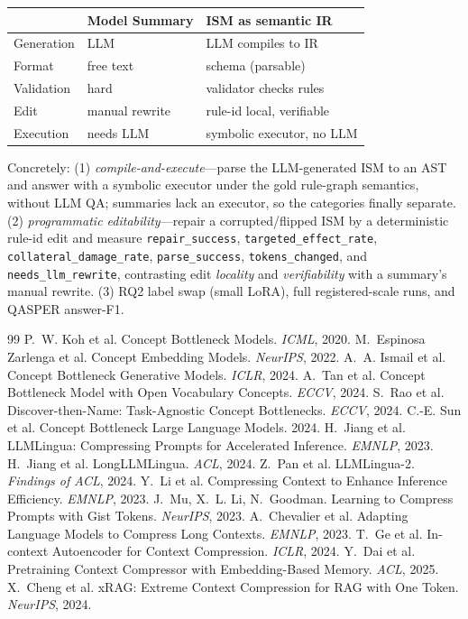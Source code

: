 \documentclass{article}
\begin{document}
\begin{center}
\begin{tabular}{lll}
\toprule
 & Model Summary & ISM as semantic IR \\
\midrule
Generation & LLM            & LLM compiles to IR \\
Format     & free text      & schema (parsable) \\
Validation & hard           & validator checks rules \\
Edit       & manual rewrite & rule-id local, verifiable \\
Execution  & needs LLM      & symbolic executor, no LLM \\
\bottomrule
\end{tabular}
\end{center}

Concretely: (1) \emph{compile-and-execute}---parse the LLM-generated ISM to an AST
and answer with a symbolic executor under the gold rule-graph semantics, without LLM
QA; summaries lack an executor, so the categories finally separate. (2)
\emph{programmatic editability}---repair a corrupted/flipped ISM by a deterministic
rule-id edit and measure \texttt{repair\_success}, \texttt{targeted\_effect\_rate},
\texttt{collateral\_damage\_rate}, \texttt{parse\_success}, \texttt{tokens\_changed},
and \texttt{needs\_llm\_rewrite}, contrasting edit \emph{locality} and
\emph{verifiability} with a summary's manual rewrite. (3) RQ2 label swap (small
LoRA), full registered-scale runs, and QASPER answer-F1.

\begin{thebibliography}{99}
 P.~W. Koh et al. Concept Bottleneck Models. \emph{ICML}, 2020.
 M.~Espinosa Zarlenga et al. Concept Embedding Models. \emph{NeurIPS}, 2022.
 A.~A. Ismail et al. Concept Bottleneck Generative Models. \emph{ICLR}, 2024.
 A.~Tan et al. Concept Bottleneck Model with Open Vocabulary Concepts. \emph{ECCV}, 2024.
 S.~Rao et al. Discover-then-Name: Task-Agnostic Concept Bottlenecks. \emph{ECCV}, 2024.
 C.-E. Sun et al. Concept Bottleneck Large Language Models. 2024.
 H.~Jiang et al. LLMLingua: Compressing Prompts for Accelerated Inference. \emph{EMNLP}, 2023.
 H.~Jiang et al. LongLLMLingua. \emph{ACL}, 2024.
 Z.~Pan et al. LLMLingua-2. \emph{Findings of ACL}, 2024.
 Y.~Li et al. Compressing Context to Enhance Inference Efficiency. \emph{EMNLP}, 2023.
 J.~Mu, X.~L. Li, N.~Goodman. Learning to Compress Prompts with Gist Tokens. \emph{NeurIPS}, 2023.
 A.~Chevalier et al. Adapting Language Models to Compress Long Contexts. \emph{EMNLP}, 2023.
 T.~Ge et al. In-context Autoencoder for Context Compression. \emph{ICLR}, 2024.
 Y.~Dai et al. Pretraining Context Compressor with Embedding-Based Memory. \emph{ACL}, 2025.
 X.~Cheng et al. xRAG: Extreme Context Compression for RAG with One Token. \emph{NeurIPS}, 2024.
\end{thebibliography}
\end{document}

